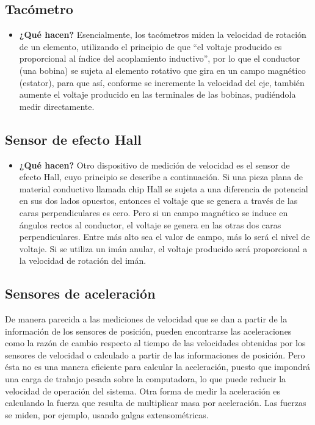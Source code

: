 \subsection*{Tacómetro}
\begin{itemize}
	\item \textbf{¿Qué hacen?} Esencialmente, los tacómetros miden la velocidad de rotación de un elemento, utilizando el principio de que “el voltaje producido es proporcional al índice del acoplamiento inductivo”, por lo que el conductor (una bobina) se sujeta al elemento rotativo que gira en un campo magnético (estator), para que así, conforme se incremente la velocidad del eje, también aumente el voltaje producido en las terminales de las bobinas, pudiéndola medir directamente.
\end{itemize}

\subsection*{Sensor de efecto Hall}
\begin{itemize}
	\item \textbf{¿Qué hacen?} Otro dispositivo de medición de velocidad es el sensor de efecto Hall, cuyo principio se describe a continuación. Si una pieza plana de material conductivo llamada chip Hall se sujeta a una diferencia de potencial en sus dos lados opuestos, entonces el voltaje que se genera a través de las caras perpendiculares es cero. Pero si un campo magnético se induce en ángulos rectos al conductor, el voltaje se genera en las otras dos caras perpendiculares. Entre más alto sea el valor de campo, más lo será el nivel de voltaje. Si se utiliza un imán anular, el voltaje producido será proporcional a la velocidad de rotación del imán.
	
\end{itemize}


\subsection{Sensores de aceleración} De manera parecida a las mediciones de velocidad que se dan a partir de la información de los sensores de posición, pueden encontrarse las aceleraciones como la razón de cambio respecto al tiempo de las velocidades obtenidas por los sensores de velocidad o calculado a partir de las informaciones de posición. Pero ésta no es una manera eficiente para calcular la aceleración, puesto que impondrá una carga de trabajo pesada sobre la computadora, lo que puede reducir la velocidad de operación del sistema. Otra forma de medir la aceleración es calculando la fuerza que resulta de multiplicar masa por aceleración. Las fuerzas se miden, por ejemplo, usando galgas extensométricas. 
